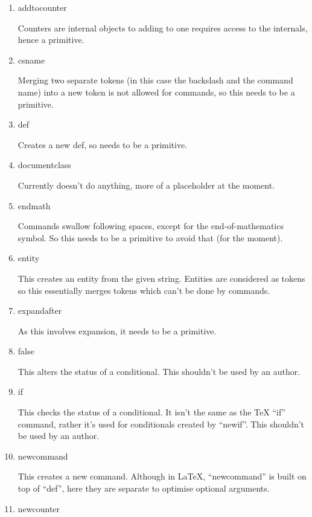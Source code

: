 \documentclass{webpage}
\begin{document}
\begin{enumerate}
\item addtocounter

Counters are internal objects to adding to one requires access to the internals, hence a primitive.

\item csname

Merging two separate tokens (in this case the backslash and the command name) into a new token is not allowed for commands, so this needs to be a primitive.

\item def

Creates a new def, so needs to be a primitive.

\item documentclass

Currently doesn't do anything, more of a placeholder at the moment.

\item endmath

Commands swallow following spaces, except for the end-of-mathematics symbol.
So this needs to be a primitive to avoid that (for the moment).

\item entity

This creates an entity from the given string.
Entities are considered as tokens so this essentially merges tokens which can't be done by commands.

\item expandafter

As this involves expansion, it needs to be a primitive.

\item false

This alters the status of a conditional.
This shouldn't be used by an author.

\item if

This checks the status of a conditional.
It isn't the same as the TeX ``if'' command, rather it's used for conditionals created by ``newif''.
This shouldn't be used by an author.

\item newcommand

This creates a new command.
Although in LaTeX, ``newcommand'' is built on top of ``def'', here they are separate to optimise optional arguments.

\item newcounter


\end{enumerate}
\end{document}
